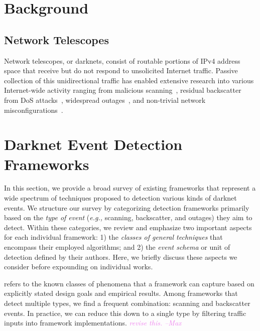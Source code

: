 \documentclass[manuscript,nonacm]{acmart}
\newcommand{\maxnote}[1]{\textit{\textcolor{violet}{#1 --Max}}}
\begin{document}
\section{Background}

\subsection{Network Telescopes}

Network telescopes, or darknets, consist of routable portions of IPv4 address space that receive but do not respond to unsolicited Internet traffic. 
Passive collection of this unidirectional traffic has enabled extensive research into various Internet-wide activity ranging from 
malicious scanning~\cite{@@}, residual backscatter from DoS attacks~\cite{@@}, widespread outages~\cite{@@}, and non-trivial network misconfigurations~\cite{@@}.


\section{Darknet Event Detection Frameworks}

In this section, we provide a broad survey of existing frameworks that represent a wide spectrum of techniques proposed to detection various kinds of darknet events.
We structure our survey by categorizing detection frameworks primarily based on the \textit{type of event} (\textit{e.g.,} scanning, backscatter, and outages) 
they aim to detect. Within these categories, we review and emphasize two important aspects for each individual framework: 1) the \textit{classes of general techniques} that encompass their employed algorithms; 
and 2) the \textit{event schema} or unit of detection defined by their authors. 
Here, we briefly discuss these aspects we consider before expounding on individual works.

 refers to the known classes of phenomena that a framework can capture based on explicitly stated design goals and empirical results.
Among frameworks that detect multiple types, we find a frequent combination: scanning and backscatter events.
In practice, we can reduce this down to a single type by filtering traffic inputs into framework implementations.
\maxnote{revise this.}

\end{document}

